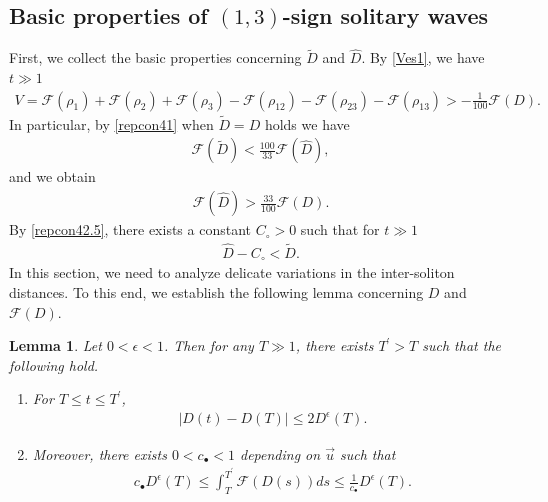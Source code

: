 \documentclass[reqno]{amsart}
\theoremstyle{plain}
\newtheorem{lemma}[theorem]{Lemma}
\theoremstyle{definition}
\numberwithin{equation}{section}
\newcommand{\1}{\mathbbm{1}}
\begin{document}
\subsection{Basic properties of $(1,3)$-sign solitary waves}
First, we collect the basic properties concerning $\tilde{D}$ and $\hat{D}$. By \eqref{Ves1}, we have $t\gg 1$
\begin{align}\label{repcon41}
V=\mathcal{F}(\rho_1)+\mathcal{F}(\rho_2)+\mathcal{F}(\rho_3)-\mathcal{F}(\rho_{12})-\mathcal{F}(\rho_{23})-\mathcal{F}(\rho_{13})>-\frac{1}{100}\mathcal{F}(D).
\end{align}
In particular, by \eqref{repcon41} when $\tilde{D}=D$ holds we have
\begin{align*}
\mathcal{F}(\tilde{D})<\frac{100}{33}\mathcal{F}(\hat{D}),
\end{align*}
and we obtain
\begin{align}\label{repcon42.5}
\mathcal{F}(\hat{D})>\frac{33}{100}\mathcal{F}(D).
\end{align}
By \eqref{repcon42.5}, there exists a constant $C_{\circ}>0$ such that for $t\gg 1$
\begin{align}\label{repcon43}
\hat{D}-C_{\circ}<\tilde{D}.
\end{align}
In this section, we need to analyze delicate variations in the inter-soliton distances. To this end, we establish the following lemma concerning $D$ and $\mathcal{F}(D)$.
\begin{lemma}\label{henchoumod}
Let $0<\epsilon<1$. Then for any $T\gg 1$, there exists $T^{\prime}>T$ such that the following hold.
\begin{enumerate}
\item For $T\leq t\leq T^{\prime}$,
\begin{align}
\left|D(t)-D(T)\right|\leq 2D^{\epsilon}(T).\label{TTprimekawaran}
\end{align}

\item Moreover, there exists $0<c_{\bullet}<1$ depending on $\vec{u}$ such that 
\begin{align}
 c_{\bullet}D^{\epsilon}(T)\leq \int_T^{T^{\prime}} \mathcal{F}(D(s))ds\leq \frac{1}{c_{\bullet}}D^{\epsilon}(T). \label{skeibunes41}
\end{align}
\end{enumerate}
\end{lemma}
\end{document}
